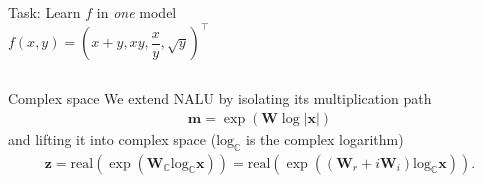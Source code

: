 \documentclass[aspectratio=169,professionalfont,xcolor={dvipsnames},hyperref={colorlinks=true,urlcolor=MidnightBlue}]{beamer}
\newcommand{\Wre}{\bm W_r}
\newcommand{\Wim}{\bm W_i}
\newcommand{\real}{\mathrm{real}}
\newcommand{\logc}{\mathrm{log}_{\mathbb{C}}}
\begin{document}
\begin{frame}
  \begin{columns}
    \centering
    Task: Learn $f$ in \emph{one} model
    \begin{equation*}
      f(x,y) = (x+y, xy, \frac{x}{y}, \sqrt{y})^\intercal
    \end{equation*}

  \end{columns}
\end{frame}

\begin{frame}{Complex space}
  We extend NALU by isolating its multiplication path
  \begin{align*}
    \bm m = \exp (\bm W\log|\bm x|)
  \end{align*}
  and lifting it into complex space ($\logc$ is the complex logarithm)
  \begin{align*}
    \bm z = \real(\exp(\bm W_\mathbb{C}\logc \bm x)) = \real(\exp\left((\Wre + i\Wim) \logc\bm x\right)).
  \end{align*}
\end{frame}
\end{document}

